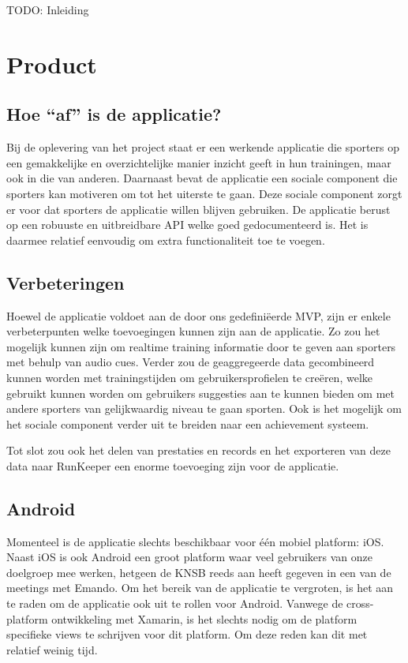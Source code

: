 {\par \bigskip \par \color{red} TODO: Inleiding \par \bigskip \par }

\section{Product}

\subsection{Hoe ``af'' is de applicatie?}
Bij de oplevering van het project staat er een werkende applicatie die sporters op een gemakkelijke en overzichtelijke manier inzicht geeft in hun trainingen, maar ook in die van anderen. Daarnaast bevat de applicatie een sociale component die sporters kan motiveren om tot het uiterste te gaan. Deze sociale component zorgt er voor dat sporters de applicatie willen blijven gebruiken. De applicatie berust op een robuuste en uitbreidbare API welke goed gedocumenteerd is. Het is daarmee relatief eenvoudig om extra functionaliteit toe te voegen.

\subsection{Verbeteringen}
Hoewel de applicatie voldoet aan de door ons gedefiniëerde MVP, zijn er enkele verbeterpunten welke toevoegingen kunnen zijn aan de applicatie. Zo zou het mogelijk kunnen zijn om realtime training informatie door te geven aan sporters met behulp van audio cues. 
Verder zou de geaggregeerde data gecombineerd kunnen worden met trainingstijden om gebruikersprofielen te creëren, welke gebruikt kunnen worden om gebruikers suggesties aan te kunnen bieden om met andere sporters van gelijkwaardig niveau te gaan sporten.
Ook is het mogelijk om het sociale component verder uit te breiden naar een achievement systeem. 

Tot slot zou ook het delen van prestaties en records en het exporteren van deze data naar RunKeeper een enorme toevoeging zijn voor de applicatie.

\subsection{Android}
Momenteel is de applicatie slechts beschikbaar voor één mobiel platform: iOS. Naast iOS is ook Android een groot platform waar veel gebruikers van onze doelgroep mee werken, hetgeen de \ac{KNSB} reeds aan heeft gegeven in een van de meetings met Emando. Om het bereik van de applicatie te vergroten, is het aan te raden om de applicatie ook uit te rollen voor Android. Vanwege de cross-platform ontwikkeling met Xamarin, is het slechts nodig om de platform specifieke views te schrijven voor dit platform. Om deze reden kan dit met relatief weinig tijd.

